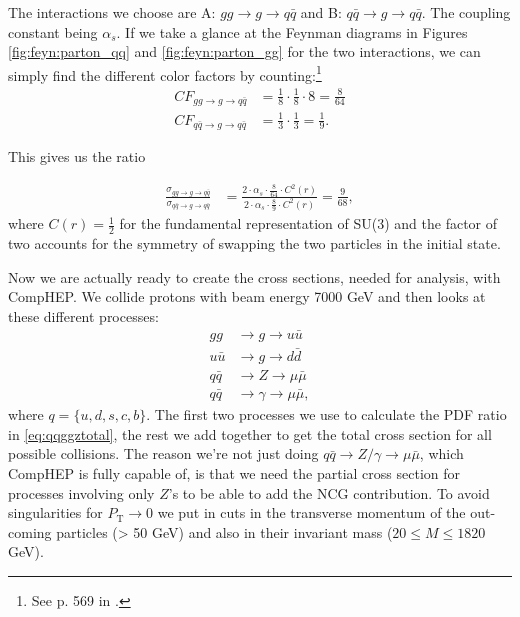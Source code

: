 The interactions we choose are A: $gg \rightarrow g \rightarrow q \bar q$ and B: $q \bar q \rightarrow g \rightarrow q \bar q$. The coupling constant being $\alpha_{s}$. If we take a glance at the Feynman diagrams in Figures \ref{fig:feyn:parton_qq} and \ref{fig:feyn:parton_gg} for the two interactions, we can simply find the different color factors by counting:\footnote{See p. 569 in  \cite{peskin1993iqf}.}
\begin{align}
	CF_{gg \rightarrow g \rightarrow q \bar q}&=\frac{1}{8} \cdot \frac{1}{8} \cdot 8=\frac{8}{64}\\
	CF_{q \bar q \rightarrow g \rightarrow q \bar q}&=\frac{1}{3} \cdot \frac{1}{3}=\frac{1}{9}.
\end{align}

This gives us the ratio

\begin{align}
	\frac{\sigma_{gg \rightarrow g \rightarrow q \bar q}}{\sigma_{q \bar q \rightarrow g \rightarrow q \bar q}} &=\frac{2 \cdot \alpha_{s} \cdot \frac{8}{64} \cdot C^{2}(r)}{2 \cdot \alpha_{s} \cdot \frac{8}{9} \cdot C^{2}(r)}=\frac{9}{68},
\end{align}
where $C(r) = \frac{1}{2}$ for the fundamental representation of SU(3) and the factor of two accounts for the symmetry of swapping the two particles in the initial state.

Now we are actually ready to create the cross sections, needed for analysis, with CompHEP. We collide protons with beam energy 7000 GeV and then looks at these different processes:
\begin{align}
gg &\rightarrow g \rightarrow u \bar u \nonumber \\ \nonumber
u \bar u &\rightarrow g \rightarrow d \bar d \\ \nonumber
q \bar q &\rightarrow Z \rightarrow \mu \bar \mu \\ \nonumber
q \bar q &\rightarrow \gamma \rightarrow \mu \bar \mu,
\end{align}
where $q = \{u,d,s,c,b\}$. The first two processes we use to calculate the PDF ratio in \eqref{eq:qqggztotal}, the rest we add together to get the total cross section for all possible collisions. The reason we're not just doing $q \bar q \rightarrow Z/ \gamma \rightarrow \mu \bar \mu$, which CompHEP is fully capable of, is that we need the partial cross section for processes involving only $Z$'s to be able to add the NCG contribution. To avoid singularities for $P_\textrm{T} \rightarrow 0$ we put in cuts in the transverse momentum of the out-coming particles (> 50 GeV) and also in their invariant mass ($20 \leq M \leq 1820$ GeV).

